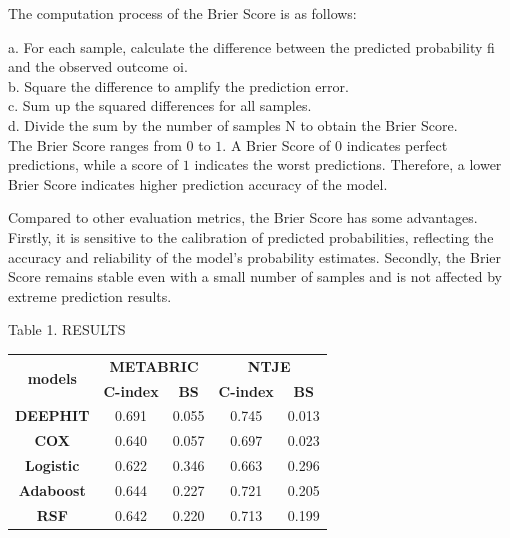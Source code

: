 \documentclass[conference]{IEEEconf}
\begin{document}
The computation process of the Brier Score is as follows:

a. For each sample, calculate the difference between the predicted probability fi and the observed outcome oi.\\
b. Square the difference to amplify the prediction error.\\
c. Sum up the squared differences for all samples.\\
d. Divide the sum by the number of samples N to obtain the Brier Score.\\

The Brier Score ranges from $0$ to $1$. A Brier Score of $0$ indicates perfect predictions, while a score of $1$ indicates the worst predictions. Therefore, a lower Brier Score indicates higher prediction accuracy of the model.

Compared to other evaluation metrics, the Brier Score has some advantages. Firstly, it is sensitive to the calibration of predicted probabilities, reflecting the accuracy and reliability of the model's probability estimates. Secondly, the Brier Score remains stable even with a small number of samples and is not affected by extreme prediction results.
\begin{table}[]
	\centering
	\centerline {Table 1. RESULTS}
	\begin{tabular}{|c|cc|cc|}
		\hline
		\multirow{2}{*}{\textbf{models}} & \multicolumn{2}{c|}{\textbf{METABRIC}}              & \multicolumn{2}{c|}{\textbf{NTJE}}                  \\ \cline{2-5} 
		& \multicolumn{1}{c|}{\textbf{C-index}} & \textbf{BS} & \multicolumn{1}{c|}{\textbf{C-index}} & \textbf{BS} \\ \hline
		\textbf{DEEPHIT}                 & \multicolumn{1}{c|}{0.691}            & 0.055       & \multicolumn{1}{c|}{0.745}            & 0.013       \\ \hline
		\textbf{COX}                     & \multicolumn{1}{c|}{0.640}            & 0.057       & \multicolumn{1}{c|}{0.697}            & 0.023       \\ \hline
		\textbf{Logistic}                & \multicolumn{1}{c|}{0.622}            & 0.346       & \multicolumn{1}{c|}{0.663}            & 0.296       \\ \hline
		\textbf{Adaboost}                & \multicolumn{1}{c|}{0.644}            & 0.227       & \multicolumn{1}{c|}{0.721}            & 0.205       \\ \hline
		\textbf{RSF}                      & \multicolumn{1}{c|}{0.642}            & 0.220       & \multicolumn{1}{c|}{0.713}            & 0.199       \\ \hline
	\end{tabular}
\end{table}
\end{document}
